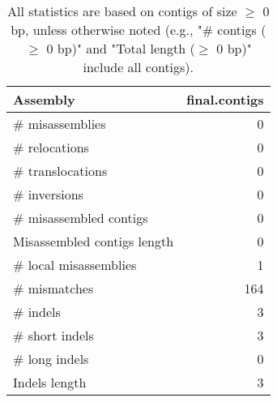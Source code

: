 \documentclass[12pt,a4paper]{article}
\begin{document}
\begin{table}[ht]
\begin{center}
\caption{All statistics are based on contigs of size $\geq$ 0 bp, unless otherwise noted (e.g., "\# contigs ($\geq$ 0 bp)" and "Total length ($\geq$ 0 bp)" include all contigs).}
\begin{tabular}{|l*{1}{|r}|}
\hline
Assembly & final.contigs \\ \hline
\# misassemblies & 0 \\ \hline
\hspace{5mm}\# relocations & 0 \\ \hline
\hspace{5mm}\# translocations & 0 \\ \hline
\hspace{5mm}\# inversions & 0 \\ \hline
\# misassembled contigs & 0 \\ \hline
Misassembled contigs length & 0 \\ \hline
\# local misassemblies & 1 \\ \hline
\# mismatches & 164 \\ \hline
\# indels & 3 \\ \hline
\hspace{5mm}\# short indels & 3 \\ \hline
\hspace{5mm}\# long indels & 0 \\ \hline
Indels length & 3 \\ \hline
\end{tabular}
\end{center}
\end{table}
\end{document}
